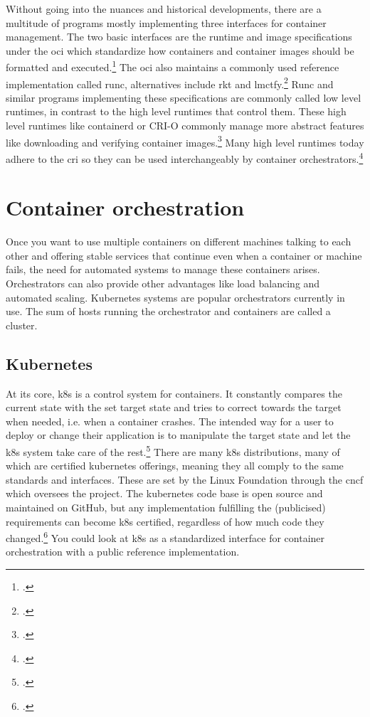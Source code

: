 Without going into the nuances and historical developments, there are a multitude of programs mostly implementing three interfaces for container management.
The two basic interfaces are the runtime and image specifications under the \gls{oci} which standardize how containers and container images should be formatted and executed.\footcite[][, first paragraph]{ociStandards}
The \gls{oci} also maintains a commonly used reference implementation called runc, alternatives include rkt and lmctfy.\footcite[][, section 'Examples of Low-Level Container Runtimes']{lowLevelRuntimes}
Runc and similar programs implementing these specifications are commonly called low level runtimes, in contrast to the high level runtimes that control them.
These high level runtimes like containerd or CRI-O commonly manage more abstract features like downloading and verifying container images.\footcite[][, Intro and section 'Examples of High-Level Runtimes']{highLevelRuntimes}
Many high level runtimes today adhere to the \gls{cri} so they can be used interchangeably by container orchestrators.\footcite[][, section 'Purpose']{criGithub}


\section{Container orchestration}
Once you want to use multiple containers on different machines talking to each other and offering stable services that continue even when a container or machine fails, the need for automated systems to manage these containers arises. Orchestrators can also provide other advantages like load balancing and automated scaling.
Kubernetes systems are popular orchestrators currently in use.
The sum of hosts running the orchestrator and containers are called a cluster.

\subsection{Kubernetes}
At its core, \gls{k8s} is a control system for containers.
It constantly compares the current state with the set target state and tries to correct towards the target when needed, i.e. when a container crashes.
The intended way for a user to deploy or change their application is to manipulate the target state and let the \gls{k8s} system take care of the rest.\footcite[][, section 'Understanding Kubernetes Objects']{k8sObjects}
There are many \gls{k8s} distributions, many of which are certified kubernetes offerings, meaning they all comply to the same standards and interfaces. These are set by the Linux Foundation through the \gls{cncf} which oversees the project.
The kubernetes code base is open source and maintained on GitHub, but any implementation fulfilling the (publicised) requirements can become \gls{k8s} certified, regardless of how much code they changed.\footcite[][, section 'There are over 80 Certified Kubernetes offerings.']{certifiedK8s} You could look at \gls{k8s} as a standardized interface for container orchestration with a public reference implementation.

